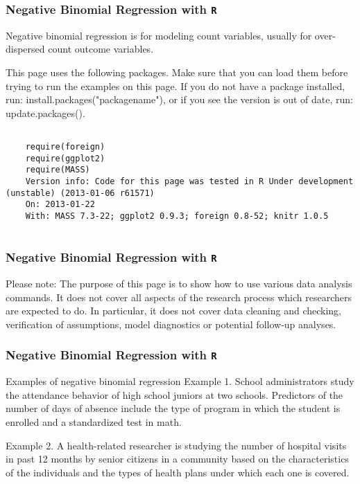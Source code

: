 \documentclass[00-GLMregslides.tex]{subfiles}
\begin{document}
	

\begin{frame}[fragile]
\frametitle{Negative Binomial Regression with \texttt{R} }
\Large


Negative binomial regression is for modeling count variables, usually for over-dispersed count outcome variables.

This page uses the following packages. Make sure that you can load them before trying to run the examples on this page. If you do not have a package installed, run: install.packages("packagename"), or if you see the version is out of date, run: update.packages().

\begin{framed}
	\begin{verbatim}
	
	require(foreign)
	require(ggplot2)
	require(MASS)
	Version info: Code for this page was tested in R Under development (unstable) (2013-01-06 r61571)
	On: 2013-01-22
	With: MASS 7.3-22; ggplot2 0.9.3; foreign 0.8-52; knitr 1.0.5
		
	\end{verbatim}	
\end{framed}


\end{frame}
\begin{frame}[fragile]
	\frametitle{Negative Binomial Regression with \texttt{R} }
	\Large
	
Please note: The purpose of this page is to show how to use various data analysis commands. It does not cover all aspects of the research process which researchers are expected to do. In particular, it does not cover data cleaning and checking, verification of assumptions, model diagnostics or potential follow-up analyses.
\end{frame}
\begin{frame}[fragile]
	\frametitle{Negative Binomial Regression with \texttt{R} }
	\Large
	
Examples of negative binomial regression
Example 1. School administrators study the attendance behavior of high school juniors at two schools. Predictors of the number of days of absence include the type of program in which the student is enrolled and a standardized test in math.

Example 2. A health-related researcher is studying the number of hospital visits in past 12 months by senior citizens in a community based on the characteristics of the individuals and the types of health plans under which each one is covered.
\end{frame}
\end{document}
